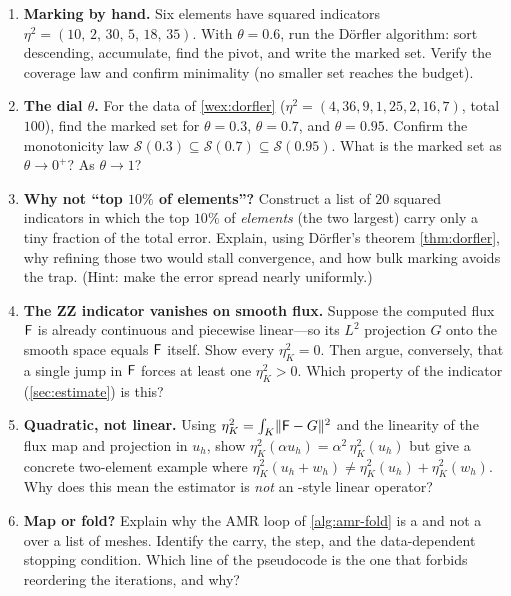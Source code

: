 \exercisessection
\begin{enumerate}[nosep]
  \item \textbf{Marking by hand.} Six elements have squared indicators
  $\eta^2 = (10,\,2,\,30,\,5,\,18,\,35)$. With $\theta = 0.6$, run the D\"orfler
  algorithm: sort descending, accumulate, find the pivot, and write the marked set.
  Verify the coverage law and confirm minimality (no smaller set reaches the budget).

  \item \textbf{The dial $\theta$.} For the data of \cref{wex:dorfler}
  ($\eta^2 = (4,36,9,1,25,2,16,7)$, total $100$), find the marked set for
  $\theta = 0.3$, $\theta = 0.7$, and $\theta = 0.95$. Confirm the monotonicity law
  $\mathcal S(0.3) \subseteq \mathcal S(0.7) \subseteq \mathcal S(0.95)$. What is the
  marked set as $\theta \to 0^+$? As $\theta \to 1$?

  \item \textbf{Why not ``top $10\%$ of elements''?} Construct a list of $20$
  squared indicators in which the top $10\%$ of \emph{elements} (the two largest)
  carry only a tiny fraction of the total error. Explain, using D\"orfler's theorem
  \cref{thm:dorfler}, why refining those two would stall convergence, and how bulk
  marking avoids the trap. (Hint: make the error spread nearly uniformly.)

  \item \textbf{The ZZ indicator vanishes on smooth flux.} Suppose the computed flux
  $\mathsf{F}$ is already continuous and piecewise linear---so its $L^2$ projection $G$
  onto the smooth space equals $\mathsf{F}$ itself. Show every $\eta_K^2 = 0$. Then argue,
  conversely, that a single jump in $\mathsf{F}$ forces at least one $\eta_K^2 > 0$. Which
  property of the indicator (\cref{sec:estimate}) is this?

  \item \textbf{Quadratic, not linear.} Using $\eta_K^2 = \int_K \lVert\mathsf{F} - G\rVert^2$
  and the linearity of the flux map and projection in $u_h$, show
  $\eta_K^2(\alpha u_h) = \alpha^2\,\eta_K^2(u_h)$ but give a concrete two-element
  example where $\eta_K^2(u_h + w_h) \ne \eta_K^2(u_h) + \eta_K^2(w_h)$. Why does this
  mean the estimator is \emph{not} an -style linear operator?

  \item \textbf{Map or fold?} Explain why the AMR loop of \cref{alg:amr-fold} is a
   and not a  over a list of meshes. Identify the carry,
  the step, and the data-dependent stopping condition. Which line of the pseudocode is
  the one that forbids reordering the iterations, and why?


\end{enumerate}
